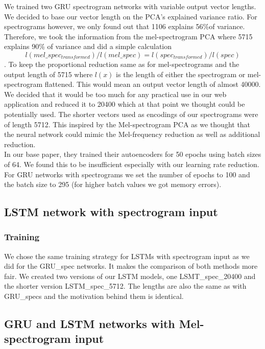 We trained two GRU spectrogram networks with variable output vector lengths. We decided to base our vector length on the PCA's explained variance ratio. For spectrograms however, we only found out that 1106 explains 56\%of variance. Therefore, we took the information from the mel-spectrogram PCA where 5715 explains 90\% of variance and did a simple calculation $$ l(mel\_spec_{transformed})/l(mel\_spec) = l(spec_{transformed})/l(spec) $$. To keep the proportional reduction same as for mel-spectrograms and the output length of 5715 where $l(x)$ is the length of either the spectrogram or mel-spectrogram flattened. This would mean an output vector length of almost 40000. We decided that it would be too much for any practical use in our web application and reduced it to 20400 which at that point we thought could be potentially used. The shorter vectors used as encodings of our spectrograms were of length 5712. This inspired by the Mel-spectrogram PCA as we thought that the neural network could mimic the Mel-frequency reduction as well as additional reduction. \\
In our base paper, they trained their autoencoders for 50 epochs using batch sizes of 64. We found this to be insufficient especially with our learning rate reduction. For GRU networks with spectrograms we set the number of epochs to 100 and the batch size to 295 (for higher batch values we got memory errors). 

\subsection{LSTM network with spectrogram input}

\subsubsection{Training}
We chose the same training strategy for LSTMs with spectrogram input as we did for the GRU\_spec networks. It makes the comparison of both methods more fair. We created two versions of our LSTM models, one LSMT\_spec\_20400 and the shorter version LSTM\_spec\_5712. The lengths are also the same as with GRU\_specs and the motivation behind them is identical.

\subsection{GRU and LSTM networks with Mel-spectrogram input}

